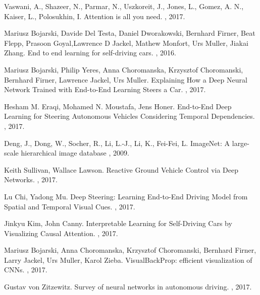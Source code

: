 \begin{thebibliography}{1}
Vaswani, A., Shazeer, N., Parmar, N., Uszkoreit, J., Jones, L., Gomez, A. N., Kaiser, L., Polosukhin, I.
\newblock Attention is all you need.
, 2017.
  
Mariusz Bojarski, Davide Del Testa, Daniel Dworakowski, Bernhard Firner, Beat Flepp, Prasoon Goyal,Lawrence D Jackel, Mathew Monfort, Urs Muller, Jiakai Zhang.
\newblock End  to  end  learning  for  self-driving  cars.
, 2016.

Mariusz Bojarski, Philip Yeres, Anna Choromanska, Krzysztof Choromanski, Bernhard Firner, Lawrence Jackel, Urs Muller. 
\newblock Explaining How a Deep Neural Network Trained with End-to-End Learning Steers a Car.
, 2017.

Hesham M. Eraqi, Mohamed N. Moustafa, Jens Honer.
\newblock End-to-End Deep Learning for Steering Autonomous Vehicles Considering Temporal Dependencies.
, 2017.

Deng, J., Dong, W., Socher, R., Li, L.-J., Li, K., Fei-Fei, L.
\newblock ImageNet: A large-scale hierarchical image database
, 2009.

Keith Sullivan, Wallace Lawson.
\newblock Reactive Ground Vehicle Control via Deep Networks.
, 2017.

Lu Chi, Yadong Mu.
\newblock Deep Steering: Learning End-to-End Driving Model from Spatial and Temporal Visual Cues.
, 2017.

Jinkyu Kim, John Canny.
\newblock Interpretable Learning for Self-Driving Cars by Visualizing Causal Attention.
, 2017.

Mariusz Bojarski, Anna Choromanska, Krzysztof Choromanski, Bernhard Firner, Larry Jackel, Urs Muller, Karol Zieba.
\newblock VisualBackProp: efficient visualization of CNNs.
, 2017.

Gustav von Zitzewitz.
\newblock Survey of neural networks in autonomous driving.
, 2017.


\end{thebibliography}
